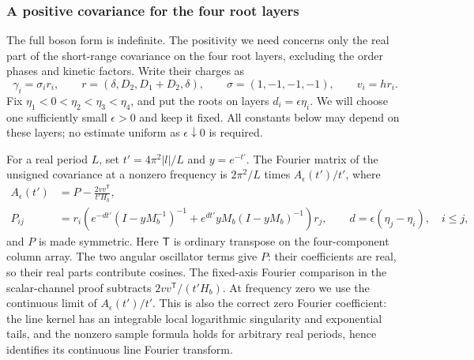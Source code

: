 \documentclass[11pt]{article}
\numberwithin{equation}{section}
\theoremstyle{definition}\newtheorem{definition}[theorem]{Definition}
\theoremstyle{remark}\newtheorem{remark}[theorem]{Remark}
\begin{document}
\subsubsection*{A positive covariance for the four root layers}

The full boson form is indefinite. The positivity we need concerns only
the real part of the short-range covariance on the four root layers,
excluding the order phases and kinetic factors. Write their charges as
\[
 \gamma_i=\sigma_i r_i,\qquad
 r=(\delta,D_2,D_1+D_2,\delta),\qquad
 \sigma=(1,-1,-1,-1),\qquad v_i=hr_i.
\]
Fix $\eta_1<0<\eta_2<\eta_3<\eta_4$, and put the roots on layers
$d_i=\epsilon\eta_i$. We will choose one sufficiently small
$\epsilon>0$ and keep it fixed. All constants below may depend on these
layers; no estimate uniform as $\epsilon\downarrow0$ is required.

For a real period $L$, set $t'=4\pi^2|l|/L$ and $y=e^{-t'}$. The Fourier
matrix of the unsigned covariance at a nonzero frequency is $2\pi^2/L$
times $A_\epsilon(t')/t'$, where
\[
\begin{split}
 A_\epsilon(t')&=P-\frac{2vv^{\mathsf T}}{t'H_b},\\
 P_{ij}&=r_i\left(e^{-dt'}(I-yM_b^{-1})^{-1}
       +e^{dt'}yM_b(I-yM_b)^{-1}\right)r_j,
 \qquad d=\epsilon(\eta_j-\eta_i),\quad i\le j,
\end{split}
\]
and $P$ is made symmetric. Here $\mathsf T$ is ordinary transpose on the
four-component column array. The two angular oscillator terms give $P$:
their coefficients are real, so their real parts contribute cosines.
The fixed-axis Fourier comparison in the scalar-channel proof subtracts
$2vv^{\mathsf T}/(t'H_b)$. At frequency zero we use the continuous limit
of $A_\epsilon(t')/t'$. This is also the correct zero Fourier coefficient:
the line kernel has an integrable local logarithmic singularity and
exponential tails, and the nonzero sample formula holds for arbitrary
real periods, hence identifies its continuous line Fourier transform.
\end{document}
